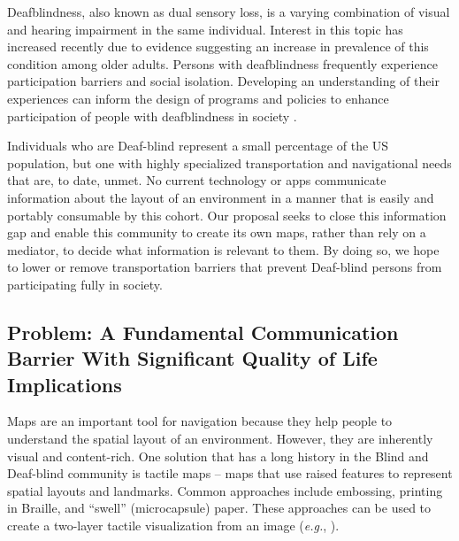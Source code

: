 


\begin{myquoting}{\cite{jaiswal2018participation}}

Deafblindness, also known as dual sensory loss, is a varying combination of visual and
hearing impairment in the same individual. Interest in this topic has increased recently due
to evidence suggesting an increase in prevalence of this condition among older adults. Persons with deafblindness frequently experience participation barriers and social isolation. Developing an understanding of their experiences can inform the design of programs and
policies to enhance participation of people with deafblindness in society .
\end{myquoting}

Individuals who are Deaf-blind represent a small percentage of the US population, but one with highly specialized transportation and navigational needs that are, to date, unmet. No current technology or apps communicate information about the layout of an environment in a manner that is easily and portably consumable by this cohort. Our proposal seeks to close this information gap and enable this community to create its own maps, rather than rely on a mediator, to decide what information is relevant to them. By doing so, we hope to lower or remove transportation barriers that prevent Deaf-blind persons from participating fully in society. 

\subsection{Problem: A Fundamental Communication Barrier With Significant Quality of Life Implications}

Maps are an important tool for navigation because they help people to understand the spatial layout of an environment. However, they are inherently visual and content-rich. One solution that has a long history in the Blind and Deaf-blind community is tactile maps – maps that use raised features to represent spatial layouts and landmarks. Common approaches include embossing, printing in Braille, and “swell” (microcapsule) paper. These approaches can be used to create a two-layer tactile visualization from an image (\textit{e.g.}, \cite{miele2006talking}).

